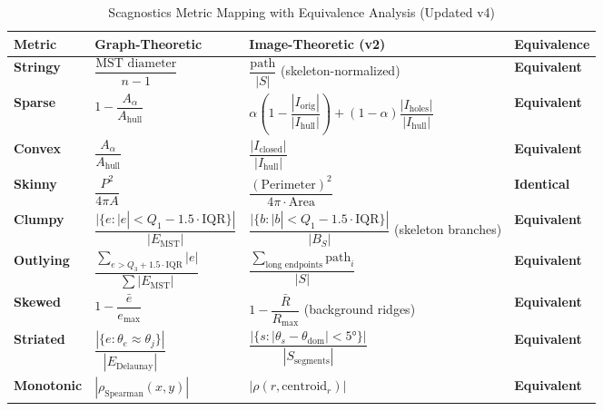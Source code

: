 \documentclass[11pt]{article}
\begin{document}
\begin{table}[h]
\centering
\caption{Scagnostics Metric Mapping with Equivalence Analysis (Updated v4)}
\small
\begin{tabular}{@{}p{1.5cm}p{3.5cm}p{4.5cm}p{2cm}@{}}
\toprule
\textbf{Metric} & \textbf{Graph-Theoretic} & \textbf{Image-Theoretic (v2)} & \textbf{Equivalence} \\\midrule

\textbf{Stringy} &
$\dfrac{\text{MST diameter}}{n-1}$ &
$\dfrac{\text{path}}{|S|}$ (skeleton-normalized) &
\cellcolor{equivalent!30}\textbf{Equivalent} \\[1.5em]

\textbf{Sparse} &
$1 - \dfrac{A_{\alpha}}{A_{\text{hull}}}$ &
$\alpha(1 - \dfrac{|I_{\text{orig}}|}{|I_{\text{hull}}|}) + (1-\alpha)\dfrac{|I_{\text{holes}}|}{|I_{\text{hull}}|}$ &
\cellcolor{equivalent!30}\textbf{Equivalent} \\[1.5em]

\textbf{Convex} &
$\dfrac{A_{\alpha}}{A_{\text{hull}}}$ &
$\dfrac{|I_{\text{closed}}|}{|I_{\text{hull}}|}$ &
\cellcolor{equivalent!30}\textbf{Equivalent} \\[1.5em]

\textbf{Skinny} &
$\dfrac{P^2}{4\pi A}$ &
$\dfrac{(\text{Perimeter})^2}{4\pi \cdot \text{Area}}$ &
\cellcolor{equivalent!30}\textbf{Identical} \\[1.5em]

\textbf{Clumpy} &
$\dfrac{|\{e : |e| < Q_1 - 1.5 \cdot \text{IQR}\}|}{|E_{\text{MST}}|}$ &
$\dfrac{|\{b : |b| < Q_1 - 1.5 \cdot \text{IQR}\}|}{|B_S|}$ (skeleton branches) &
\cellcolor{equivalent!30}\textbf{Equivalent} \\[1.5em]

\textbf{Outlying} &
$\dfrac{\sum_{e > Q_3 + 1.5 \cdot \text{IQR}} |e|}{\sum |E_{\text{MST}}|}$ &
$\dfrac{\sum_{\text{long endpoints}} \text{path}_i}{|S|}$ &
\cellcolor{equivalent!30}\textbf{Equivalent} \\[1.5em]

\textbf{Skewed} &
$1 - \dfrac{\bar{e}}{e_{\max}}$ &
$1 - \dfrac{\bar{R}}{R_{\max}}$ (background ridges) &
\cellcolor{equivalent!30}\textbf{Equivalent} \\[1.5em]

\textbf{Striated} &
$\dfrac{|\{e : \theta_e \approx \theta_j\}|}{|E_{\text{Delaunay}}|}$ &
$\dfrac{|\{s : |\theta_s - \theta_{\text{dom}}| < 5°\}|}{|S_{\text{segments}}|}$ &
\cellcolor{equivalent!30}\textbf{Equivalent} \\[1.5em]

\textbf{Monotonic} &
$|\rho_{\text{Spearman}}(x, y)|$ &
$|\rho(r, \text{centroid}_r)|$ &
\cellcolor{equivalent!30}\textbf{Equivalent} \\
\bottomrule
\end{tabular}
\end{table}
\end{document}
